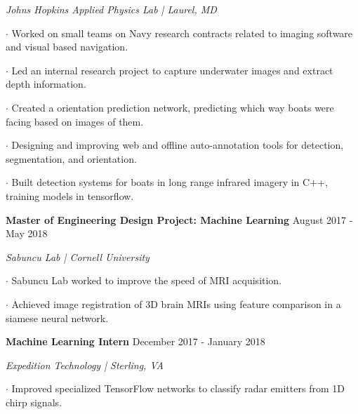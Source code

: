 \documentclass[11pt]{article} %
\begin{document}
	\setlength{\parindent}{-0ex} \par
		\textit{Johns Hopkins Applied Physics Lab | Laurel, MD} \vspace{+3ex} \par
		$\boldsymbol{\cdot}$ Worked on small teams on Navy research contracts related to imaging software and visual based navigation. \par \vspace{+1ex}
		$\boldsymbol{\cdot}$ Led an internal research project to capture underwater images and extract depth information. \par \vspace{+1ex}
		$\boldsymbol{\cdot}$ Created a orientation prediction network, predicting which way boats were facing based on images of them. \par \vspace{+1ex}
		$\boldsymbol{\cdot}$ Designing and improving web and offline auto-annotation tools for detection, segmentation, and orientation.\par \vspace{+1ex}
		$\boldsymbol{\cdot}$ Built detection systems for boats in long range infrared imagery in C++, training models in tensorflow. \par \vspace{+1ex}
    \vspace{+3ex}
    \textbf{\large Master of Engineering Design Project: Machine Learning} \hfill August 2017 - May 2018 \vspace{-0ex}
	\setlength{\parindent}{-0ex} \par
		\textit{Sabuncu Lab | Cornell University}\vspace{+3ex} \par
		$\boldsymbol{\cdot}$ Sabuncu Lab worked to improve the speed of MRI acquisition. \par \vspace{+1ex}
		$\boldsymbol{\cdot}$ Achieved image registration of 3D brain MRIs using feature comparison in a siamese neural network. \par \vspace{+3ex}
	\setlength{\itemindent}{0in}
	\vspace{+1ex} 
    \textbf{\large Machine Learning Intern} \hfill December 2017 - January 2018 \vspace{-0ex}
	\setlength{\parindent}{-0ex} \par
		\textit{Expedition Technology | Sterling, VA} \vspace{+3ex} \par
		$\boldsymbol{\cdot}$ Improved specialized TensorFlow networks to classify radar emitters from 1D chirp signals. \par 
\end{document}
